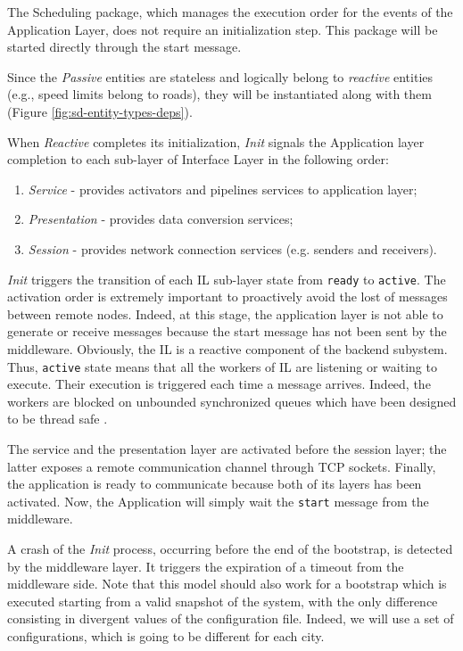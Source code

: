 The Scheduling package, which manages the execution order for the events of the
Application Layer, does not require an initialization step. This package
will be started directly through the start message.


Since the \textit{Passive} entities are stateless and
logically belong to \textit{reactive} entities (e.g., speed limits belong to
roads), they will be instantiated along with them
(Figure \ref{fig:sd-entity-types-deps}).

When \textit{Reactive} completes its initialization, \textit{Init}
signals the Application layer completion to each sub-layer of Interface Layer
in the following order:

\begin{enumerate}
  \item \textit{Service} - provides activators and pipelines services to
    application layer;
  \item \textit{Presentation} - provides data conversion services;
  \item \textit{Session} - provides network connection services (e.g. senders
  and receivers).
\end{enumerate}

\textit{Init} triggers the transition of each IL sub-layer state from
\verb|ready| to \verb|active|.
The activation order is extremely important to proactively avoid the lost of
messages between remote nodes. Indeed, at this stage, the application layer is
not able to generate or receive messages because the start message has not
been sent by the middleware. Obviously, the IL is a reactive component
of the backend subystem. Thus, \verb|active| state means
that all the workers of IL
are listening or waiting to execute. Their execution is triggered each time a
message arrives. Indeed, the workers are blocked on unbounded synchronized
queues which have been designed to be thread safe \cite{taft2006ada}.

The service and the presentation layer are activated before the session layer;
the latter exposes a remote communication channel through TCP
sockets.
Finally, the application is ready to communicate because both of its layers
has been activated. Now, the Application will simply wait the \verb|start|
message from the middleware.

A crash of the \textit{Init} process, occurring before the end of the
bootstrap, is detected by the middleware layer. It triggers the expiration
of a timeout from the middleware side.
Note that this model should also work for a bootstrap which is executed
starting
from a valid snapshot of the system, with the only difference consisting in
divergent values of the configuration file. Indeed, we will use a set
of configurations, which is going to be different for each city.

